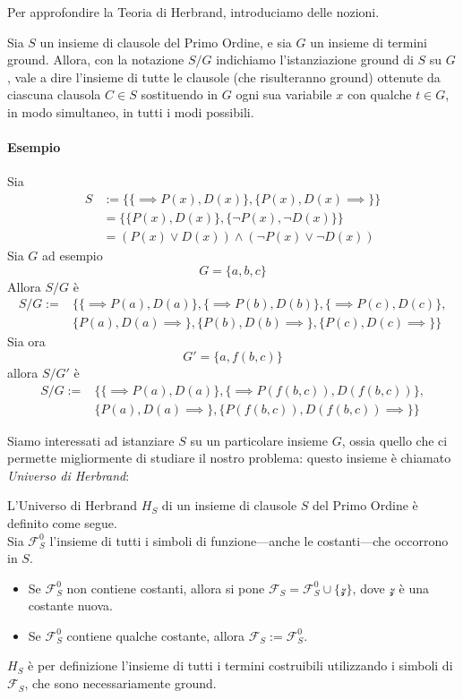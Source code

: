 Per approfondire la Teoria di Herbrand, introduciamo delle nozioni. 

\begin{defi}
Sia $S$ un insieme di clausole del Primo Ordine, e sia $G$ un insieme di termini ground. Allora, con la notazione $S/G$ indichiamo l'istanziazione ground di $S$ su $G$, vale a dire l'insieme di tutte le clausole (che risulteranno ground) ottenute da ciascuna clausola $C \in S$ sostituendo in $G$ ogni sua variabile $x$ con qualche $t \in G$, in modo simultaneo, in tutti i modi possibili.
\end{defi}
\paragraph{Esempio}
Sia 
\begin{align*}
        S &:= \{\{\implies P(x),D(x)\}, \{P(x), D(x) \implies\}\} \\
          &= \{\{P(x), D(x)\}, \{\neg P(x), \neg D(x)\}\} \\
          &= (P(x) \lor D(x)) \land (\neg P(x) \lor \neg D(x))
\end{align*}
Sia $G$ ad esempio 
$$
G = \{a, b, c\}
$$
Allora $S/G$ è 
\begin{align*}
S/G := &\{\{\implies P(a),D(a)\}, \{\implies P(b), D(b)\}, \{\implies P(c), D(c)\}, \\
       &\{P(a),D(a) \implies\},\{P(b),D(b) \implies\},\{P(c),D(c) \implies\}\}
\end{align*}
Sia ora 
$$
G' = \{a, f(b,c)\}
$$
allora $S/G'$ è 
\begin{align*}
        S/G := &\{\{\implies P(a),D(a)\}, \{\implies P(f(b,c)), D(f(b,c))\}, \\
               &\{P(a),D(a) \implies\},\{P(f(b,c)),D(f(b,c)) \implies\}\}
\end{align*}


\noindent 
Siamo interessati ad istanziare $S$ su un particolare insieme $G$, ossia quello 
che ci permette migliormente di studiare il nostro problema: questo 
insieme è chiamato \textit{Universo di Herbrand}:
\begin{defi}
L'Universo di Herbrand $H_S$ di un insieme di clausole $S$ del Primo Ordine è definito come segue. \\
Sia $\mathscr{F}^0_S$ l'insieme di tutti i simboli di funzione—anche le costanti—che occorrono in $S$.
\begin{itemize}
  \item Se $\mathscr{F}^0_S$ non contiene costanti, allora si pone $\mathscr{F}_S = \mathscr{F}^0_S \cup \{\mathcal{z}\}$, dove $\mathcal{z}$ è una costante nuova.
  \item Se $\mathscr{F}^0_S$ contiene qualche costante, allora $\mathscr{F}_S := \mathscr{F}^0_S$.
\end{itemize}
$H_S$ è per definizione l'insieme di tutti i termini costruibili utilizzando i simboli di $\mathscr{F}_S$, che sono necessariamente ground. 
\end{defi}

